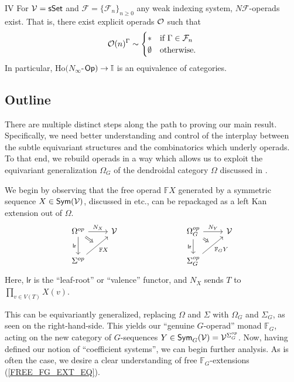 \documentclass[a4paper,10pt]{article}%
\begin{document}
\begin{customcor}{IV}\label{NINFTY_REAL_COR_MAIN}
For $\mathcal V = \mathsf{sSet}$ and 
$\mathcal{F} = \{\mathcal{F}_n\}_{n \geq 0}$
any weak indexing system,
$N \mathcal{F}$-operads exist. That is, there exist explicit operads $\mathcal{O}$
such that
\begin{equation}%
	\O(n)^{\Gamma} \sim 
\begin{cases}
	\** & \text{if } \Gamma \in \mathcal{F}_n
\\
	\emptyset & \text{otherwise}.
\end{cases}
\end{equation}  
In particular, $\mathrm{Ho}(N_\infty$-$\mathsf{Op}) \to \mathbb I$ is an equivalence of categories.%
\end{customcor}

\subsection{Outline}


There are multiple distinct steps along the path to proving our main result.  Specifically, we need better understanding and control of the interplay between the subtle equivariant structures and the combinatorics which underly operads. To that end, we rebuild operads in a way which allows us to exploit the equivariant generalization $\Omega_G$ of the dendroidal category $\Omega$ discussed in \cite{Pe17}. 

We begin by observing that the free operad $\mathbb F X$ generated by a symmetric sequence $X \in \mathsf{Sym}(\mathcal V)$, discussed in \cite{Spitz01, BM03, Rub17} etc., can be repackaged as a left Kan extension out of $\Omega$.
\[
\begin{tikzcd}
        |[alias=U]| \Omega^{op} \arrow[d, "\mathsf{lr}"'] \arrow[r, "N_X"] & \V & \qquad & |[alias=A]| \Omega_G^{op} \arrow[d, "\mathsf{lr}"'] \arrow[r, "N_Y"] & \V\\
        \Sigma^{op} \arrow[ur, "\mathbb F X"', ""{name=V}] & && \Sigma_G^{op} \arrow[ur, "\mathbb F_G Y"', ""{name=B}]
        \arrow[Rightarrow, from=U, to=V] 
        \arrow[Rightarrow, from=A, to=B]
\end{tikzcd}
\]
Here, $\mathsf{lr}$ is the ``leaf-root'' or ``valence'' functor, and $N_X$ sends $T$ to $\prod_{v\in V(T)} X(v)$.

This can be equivariantly generalized, replacing $\Omega$ and $\Sigma$ with $\Omega_G$ and $\Sigma_G$, as seen on the right-hand-side. This yields our ``genuine $G$-operad'' monad $\mathbb F_G$, acting on the new category of $G$-sequences $Y\in \mathsf{Sym}_G(\mathcal V) = \mathcal V^{\Sigma_G^{op}}$. Now, having defined our notion of ``coefficient systems'', we can begin further analysis. As is often the case, we desire a clear understanding of free $\mathbb F_G$-extensions (\ref{FREE_FG_EXT_EQ}). 
\end{document}
